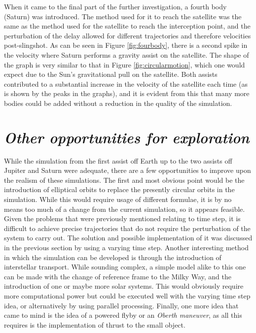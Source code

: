 \documentclass[11pt, english]{report}
\begin{document}
{When it came to the final part of the further investigation, a fourth body (Saturn) was introduced. The method used for it to reach the satellite was the same as the method used for the satellite to reach the interception point, and the perturbation of the delay allowed for different trajectories and therefore velocities post-slingshot. As can be seen in Figure \ref{fig:fourbody}, there is a second spike in the velocity where Saturn performs a gravity assist on the satellite. The shape of the graph is very similar to that in Figure \ref{fig:circularmotion}, which one would expect due to the Sun's gravitational pull on the satellite. Both assists contributed to a substantial increase in the velocity of the satellite each time (as is shown by the peaks in the graphs), and it is evident from this that many more bodies could be added without a reduction in the quality of the simulation.
}

\section{\textsl{Other opportunities for exploration}}
\normalsize{\noindent While the simulation from the first assist off Earth up to the two assists off Jupiter and Saturn were adequate, there are a few opportunities to improve upon the realism of these simulations. The first and most obvious point would be the introduction of elliptical orbits to replace the presently circular orbits in the simulation. While this would require usage of different formulae, it is by no means too much of a change from the current simulation, so it appears feasible. Given the problems that were previously mentioned relating to time step, it is difficult to achieve precise trajectories that do not require the perturbation of the system to carry out. The solution and possible implementation of it was discussed in the previous section by using a varying time step. Another interesting method in which the simulation can be developed is through the introduction of interstellar transport. While sounding complex, a simple model alike to this one can be made with the change of reference frame to the Milky Way, and the introduction of one or maybe more solar systems. This would obviously require more computational power but could be executed well with the varying time step idea, or alternatively by using parallel processing. Finally, one more idea that came to mind is the idea of a powered flyby or an \emph{Oberth maneuver}, as all this requires is the implementation of thrust to the small object. }
\end{document}
